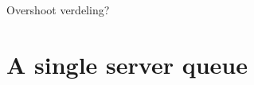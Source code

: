 \documentclass{scrartcl}
\begin{document}













Overshoot verdeling? 

\section{A single server queue}
\label{sec:single-server-queue}
\end{document}

